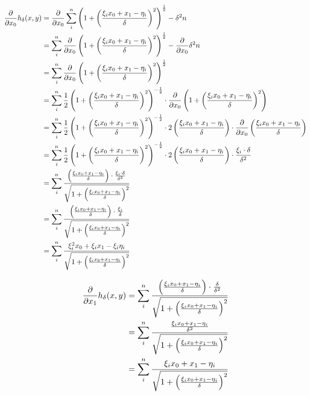\documentclass[paper=A3, 
   paper=landscape,]{scrartcl}
\begin{document}
\begin{align}
	\frac{\partial}{\partial x_0} h_\delta(x,y) &= \frac{\partial}{\partial x_0} \sum\limits_i^n \left(1+ \left( \frac {\xi_i x_0 + x_1 -\eta_i}{\delta}\right)^2 \right)^\frac{1}{2}  - \delta^2 n\\
	&=  \sum\limits_i^n \frac{\partial}{\partial x_0} \left(1+ \left( \frac {\xi_i x_0 + x_1 -\eta_i}{\delta}\right)^2 \right)^\frac{1}{2}  - \frac{\partial}{\partial x_0}  \delta^2 n\\
	&=  \sum\limits_i^n \frac{\partial}{\partial x_0} \left(1+ \left( \frac {\xi_i x_0 + x_1 -\eta_i}{\delta}\right)^2 \right)^\frac{1}{2}\\
	&=  \sum\limits_i^n \frac{1}{2} \left(1+ \left( \frac {\xi_i x_0 + x_1 -\eta_i}{\delta}\right)^2 \right)^{-\frac{1}{2}} \cdot \frac{\partial}{\partial x_0} \left(1+ \left( \frac {\xi_i x_0 + x_1 -\eta_i}{\delta}\right)^2 \right)  \\
	&=  \sum\limits_i^n \frac{1}{2} \left(1+ \left( \frac {\xi_i x_0 + x_1 -\eta_i}{\delta}\right)^2 \right)^{-\frac{1}{2}} \cdot  2\left( \frac {\xi_i x_0 + x_1 -\eta_i}{\delta}\right) \cdot \frac{\partial}{\partial x_0} \left( \frac {\xi_i x_0 + x_1 -\eta_i}{\delta} \right) \\
	&=  \sum\limits_i^n \frac{1}{2} \left(1+ \left( \frac {\xi_i x_0 + x_1 -\eta_i}{\delta}\right)^2 \right)^{-\frac{1}{2}} \cdot  2\left( \frac {\xi_i x_0 + x_1 -\eta_i}{\delta}\right) \cdot \frac{ \xi_i \cdot \delta }{\delta^2} \\
	&=  \sum\limits_i^n \frac {\left( \frac {\xi_i x_0 + x_1 -\eta_i}{\delta}\right) \cdot \frac{ \xi_i \cdot \delta }{\delta^2} } {\sqrt{1+\left( \frac{\xi_i x_0 + x_1 -\eta_i}{\delta}\right)^2  }}  \\
	&=  \sum\limits_i^n \frac {\left( \frac {\xi_i x_0 + x_1 -\eta_i}{\delta}\right) \cdot \frac{ \xi_i}{\delta} } {\sqrt{1+\left( \frac{\xi_i x_0 + x_1 -\eta_i}{\delta}\right)^2  }}  \\
	&=  \sum\limits_i^n \frac {\xi_i^2 x_0 + \xi_i x_1 - \xi_i \eta_i}{\sqrt{1+ \left( \frac {\xi_i x_0 + x_1 -\eta_i}{\delta}\right)^2  }} \\
\end{align}


\begin{align}
	\frac{\partial}{\partial x_1} h_\delta(x,y) &=  \sum\limits_i^n \frac {\left( \frac {\xi_i x_0 + x_1 -\eta_i}{\delta}\right) \cdot \frac{\delta }{\delta^2} } {\sqrt{1+ \left( \frac {\xi_i x_0 + x_1 -\eta_i}{\delta}\right)^2  }}  \\
	&=  \sum\limits_i^n \frac {\frac {\xi_i x_0 + x_1 -\eta_i}{\delta^2} } {\sqrt{1+ \left( \frac {\xi_i x_0 + x_1 -\eta_i}{\delta}\right)^2  }}\\
	&=  \sum\limits_i^n \frac {\xi_i x_0 + x_1 -\eta_i}{\sqrt{1+ \left( \frac {\xi_i x_0 + x_1 -\eta_i}{\delta}\right)^2  }} \\
\end{align}
\end{document}
